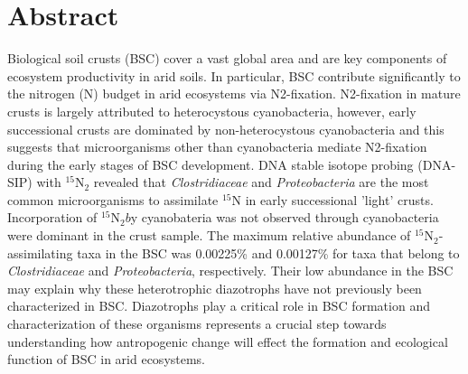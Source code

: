 \section{Abstract}
Biological soil crusts (BSC) cover a vast global area and are key components of ecosystem productivity in arid soils. In particular, BSC contribute significantly to the nitrogen (N) budget in arid ecosystems via N2-fixation. N2-fixation in mature crusts is largely attributed to heterocystous cyanobacteria, however, early successional crusts are dominated by non-heterocystous cyanobacteria and this suggests that microorganisms other than cyanobacteria mediate N2-fixation during the early stages of BSC development. DNA stable isotope probing (DNA-SIP) with $^{15}$N$_{2}$ revealed that \textit{Clostridiaceae} and \textit{Proteobacteria} are the most common microorganisms to assimilate $^{15}$N in early successional 'light' crusts. Incorporation of $^{15}$N$_{2} b$y cyanobateria was not observed through cyanobacteria were dominant in the crust sample. The maximum relative abundance of $^{15}$N$_{2}$-assimilating taxa in the BSC was 0.00225\% and 0.00127\% for taxa that belong to \textit{Clostridiaceae} and \textit{Proteobacteria}, respectively. Their low abundance in the BSC may explain why these heterotrophic diazotrophs have not previously been characterized in BSC. Diazotrophs play a critical role in BSC formation and characterization of these organisms represents a crucial step towards understanding how antropogenic change will effect the formation and ecological function of BSC in arid ecosystems.



